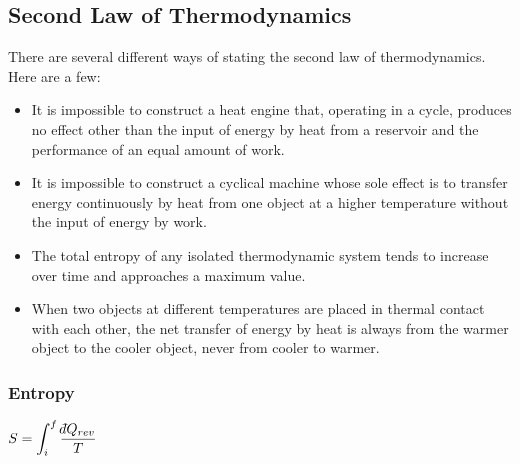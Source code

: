 \subsection{Second Law of Thermodynamics}
There are several different ways of stating the second law of thermodynamics. Here are a few:
\begin{itemize}
\item It is impossible to construct a heat engine that, operating in a cycle, produces no effect other than the input of energy by heat from a reservoir and the performance of an equal amount of work.
\item It is impossible to construct a cyclical machine whose sole effect is to transfer energy continuously by heat from one object at a higher temperature without the input of energy by work.
\item The total entropy of any isolated thermodynamic system tends to increase over time and approaches a maximum value.
\item When two objects at different temperatures are placed in thermal contact with each other, the net transfer of energy by heat is always from the warmer object to the cooler object, never from cooler to warmer.
\end{itemize}

\subsubsection{Entropy}
\(\displaystyle S=\int_i^f{\frac{\dbar Q_{rev}}{T}}\)

